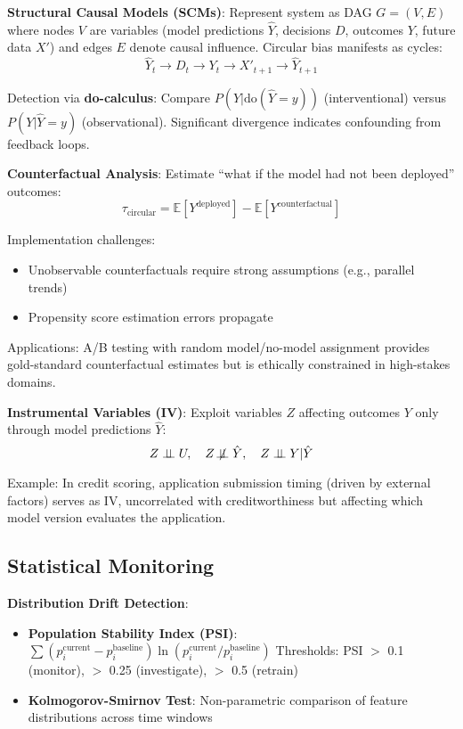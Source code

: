 \documentclass[11pt,a4paper]{article}
\begin{document}
\textbf{Structural Causal Models (SCMs)}:  
Represent system as DAG $G = (V, E)$ where nodes $V$ are variables (model predictions $\hat{Y}$, decisions $D$, outcomes $Y$, future data $X'$) and edges $E$ denote causal influence. Circular bias manifests as cycles:
\begin{equation}
\hat{Y}_t \rightarrow D_t \rightarrow Y_t \rightarrow X'_{t+1} \rightarrow \hat{Y}_{t+1}
\end{equation}

Detection via \textbf{do-calculus}: Compare $P(Y | \text{do}(\hat{Y}=y))$ (interventional) versus $P(Y | \hat{Y}=y)$ (observational). Significant divergence indicates confounding from feedback loops.

\textbf{Counterfactual Analysis}:  
Estimate ``what if the model had not been deployed'' outcomes:
\begin{equation}
\tau_{\text{circular}} = \mathbb{E}[Y^{\text{deployed}}] - \mathbb{E}[Y^{\text{counterfactual}}]
\end{equation}

Implementation challenges:
\begin{itemize}
    \item Unobservable counterfactuals require strong assumptions (e.g., parallel trends)
    \item Propensity score estimation errors propagate
\end{itemize}

Applications: A/B testing with random model/no-model assignment provides gold-standard counterfactual estimates but is ethically constrained in high-stakes domains.

\textbf{Instrumental Variables (IV)}:  
Exploit variables $Z$ affecting outcomes $Y$ only through model predictions $\hat{Y}$:
\begin{equation}
Z \perp\!\!\!\perp U, \quad Z \not\!\perp\!\!\!\perp \hat{Y}, \quad Z \perp\!\!\!\perp Y | \hat{Y}
\end{equation}

Example: In credit scoring, application submission timing (driven by external factors) serves as IV, uncorrelated with creditworthiness but affecting which model version evaluates the application.

\subsection{Statistical Monitoring}

\textbf{Distribution Drift Detection}:  
\begin{itemize}
    \item \textbf{Population Stability Index (PSI)}: $\sum (p_i^{\text{current}} - p_i^{\text{baseline}}) \ln(p_i^{\text{current}}/p_i^{\text{baseline}})$  
    Thresholds: PSI $>$ 0.1 (monitor), $>$ 0.25 (investigate), $>$ 0.5 (retrain)
    
    \item \textbf{Kolmogorov-Smirnov Test}: Non-parametric comparison of feature distributions across time windows
\end{itemize}
\end{document}

